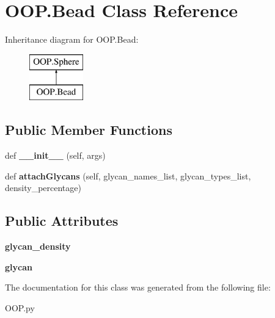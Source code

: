 \hypertarget{class_o_o_p_1_1_bead}{}\section{O\+O\+P.\+Bead Class Reference}
\label{class_o_o_p_1_1_bead}
Inheritance diagram for O\+O\+P.\+Bead\+:\begin{figure}[H]
\begin{center}
\leavevmode
\includegraphics[height=2.000000cm]{class_o_o_p_1_1_bead}
\end{center}
\end{figure}
\subsection*{Public Member Functions}
\begin{DoxyCompactItemize}
\item 
\mbox{\label{class_o_o_p_1_1_bead_a0bbaef493483785c91a9d65119cf03f7}} 
def {\bfseries \+\_\+\+\_\+init\+\_\+\+\_\+} (self, args)
\item 
\mbox{\label{class_o_o_p_1_1_bead_a5c3fdb6f49fa45d5484e7fa1547e11d9}} 
def {\bfseries attach\+Glycans} (self, glycan\+\_\+names\+\_\+list, glycan\+\_\+types\+\_\+list, density\+\_\+percentage)
\end{DoxyCompactItemize}
\subsection*{Public Attributes}
\begin{DoxyCompactItemize}
\item 
\mbox{\label{class_o_o_p_1_1_bead_a6077018c22bee0df53ac3f034a5cc43e}} 
{\bfseries glycan\+\_\+density}
\item 
\mbox{\label{class_o_o_p_1_1_bead_a889f4d823c56c1a5ef77f720167de381}} 
{\bfseries glycan}
\end{DoxyCompactItemize}


The documentation for this class was generated from the following file\+:\begin{DoxyCompactItemize}
\item 
O\+O\+P.\+py\end{DoxyCompactItemize}
